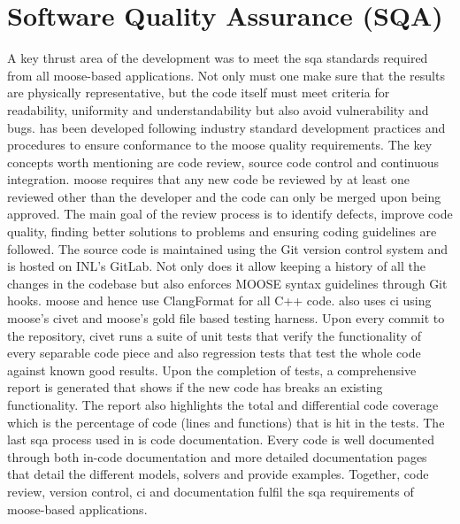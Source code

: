 \section{Software Quality Assurance (SQA)}
	A key thrust area of the {\GEM} development was to meet the \gls{sqa} standards required from all \gls{moose}-based applications. Not only must one make sure that the results are physically representative, but the code itself must meet criteria for readability, uniformity and understandability but also avoid vulnerability and bugs.
{\GEM} has been developed following industry standard  development practices and procedures to ensure conformance to the \gls{moose} quality requirements. The key concepts worth mentioning are code review, source code control and continuous integration. \gls{moose} requires that any new code be reviewed by at least one reviewed other than the developer and the code can only be merged upon being approved. The main goal of the review process is to identify defects, improve code quality, finding better solutions to problems and ensuring coding guidelines are followed. The source code is maintained using the Git version control system and is hosted on INL's GitLab. Not only does it allow keeping a history of all the changes in the codebase but also enforces MOOSE syntax guidelines through Git hooks. \gls{moose} and hence {\GEM} use ClangFormat for all C++ code. {\GEM} also uses \gls{ci} using \gls{moose}'s \gls{civet} \cite{Slaughter:2021aa} and \gls{moose}'s gold file based testing harness. Upon every commit to the repository, \gls{civet} runs a suite of unit tests that verify the functionality of every separable code piece and also regression tests that test the whole code against known good results. Upon the completion of tests, a comprehensive report is generated that shows if the new code has breaks an existing functionality. The report also highlights the total and differential code coverage which is the percentage of code (lines and functions) that is hit in the tests. The last \gls{sqa} process used in {\GEM} is code documentation. Every code is well documented through both in-code documentation and more detailed documentation pages that detail the different models, solvers and provide examples. Together, code review, version control, \gls{ci} and documentation fulfil the \gls{sqa} requirements of \gls{moose}-based applications.

